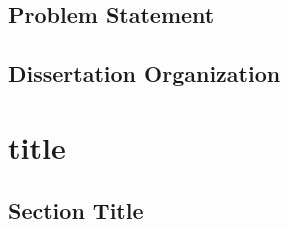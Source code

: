 \documentclass[ms,twoside, 12pt]{kfupm_thesis}
\begin{document}
    \section{Problem Statement}
    \label{sec1.2}
    
    
    \section{Dissertation Organization}
    \label{sec1.3}
    

\newpage
\chapter{title}
\label{ch2}
    \section{Section Title}
    \label{sec2.1}
    










\newpage

\newpage

\newpage

\newpage

\end{document}
